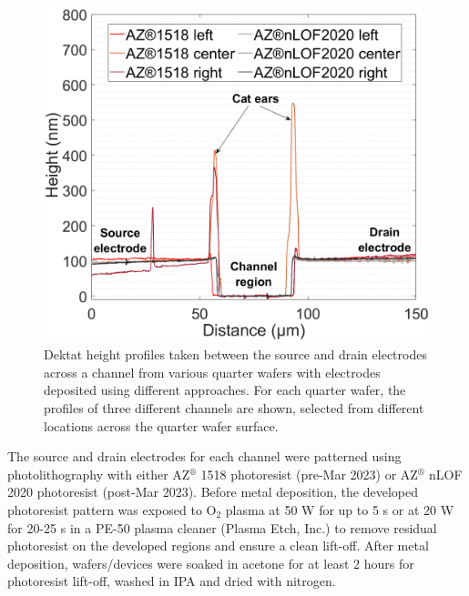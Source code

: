 \documentclass[
  a4paper,
]{scrbook}
\begin{document}
\begin{figure}
\begin{minipage}[t]{0.47\linewidth}
{{\includegraphics{./figures/ch4/dektat_1518nlof_profile_comparison.png}

}

}

\end{minipage}%

\caption{\label{fig-electrodes-dektat}Dektat height profiles taken
between the source and drain electrodes across a channel from various
quarter wafers with electrodes deposited using different approaches. For
each quarter wafer, the profiles of three different channels are shown,
selected from different locations across the quarter wafer surface.}

\end{figure}

The source and drain electrodes for each channel were patterned using
photolithography with either AZ\(^\circledR\) 1518 photoresist (pre-Mar
2023) or AZ\(^\circledR\) nLOF 2020 photoresist (post-Mar 2023). Before
metal deposition, the developed photoresist pattern was exposed to
O\(_2\) plasma at 50 W for up to 5 s or at 20 W for 20-25 s in a PE-50
plasma cleaner (Plasma Etch, Inc.) to remove residual photoresist on the
developed regions and ensure a clean lift-off. After metal deposition,
wafers/devices were soaked in acetone for at least 2 hours for
photoresist lift-off, washed in IPA and dried with nitrogen.
\end{document}
